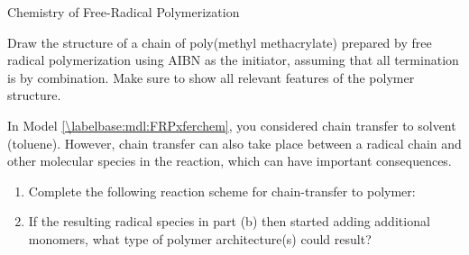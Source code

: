 \begin{activity}{Chemistry of Free-Radical Polymerization}
\begin{exercises}
	\exercise Draw the structure of a chain of poly(methyl methacrylate) prepared by free radical polymerization using AIBN as the initiator, assuming that all termination is by combination.  Make sure to show all relevant features of the polymer structure.
	
		\begin{solution}\end{solution}
	
	\exercise In Model \ref{\labelbase:mdl:FRPxferchem}, you considered chain transfer to solvent (toluene).  However, chain transfer can also take place between a radical chain and other molecular species in the reaction, which can have important consequences.
	
		\begin{enumerate}
			
			\item Complete the following reaction scheme for chain-transfer to polymer:
	
			\begin{solution}\end{solution}
			
			\item If the resulting radical species in part (b) then started adding additional monomers, what type of polymer architecture(s) could result?
			
				\begin{solution}\end{solution}
		\end{enumerate}
		
	
\end{exercises}


%
%	


	
\end{activity}